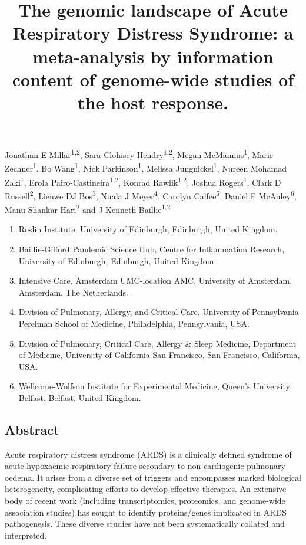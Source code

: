 \documentclass[
  11,
  a4paper,
]{article}
\title{The genomic landscape of Acute Respiratory Distress Syndrome: a
meta-analysis by information content of genome-wide studies of the host
response.}
\author{}
\date{}
\providecommand{\tightlist}{%
  \setlength{\itemsep}{0pt}\setlength{\parskip}{0pt}}\usepackage{longtable,booktabs,array}
\begin{document}
\maketitle

Jonathan E Millar\textsuperscript{1,2}, Sara
Clohisey-Hendry\textsuperscript{1,2}, Megan McMannus\textsuperscript{1},
Marie Zechner\textsuperscript{1}, Bo Wang\textsuperscript{1}, Nick
Parkinson\textsuperscript{1}, Melissa Jungnickel\textsuperscript{1},
Nureen Mohamad Zaki\textsuperscript{1}, Erola
Pairo-Castineira\textsuperscript{1,2}, Konrad
Rawlik\textsuperscript{1,2}, Joshua Rogers\textsuperscript{1}, Clark D
Russell\textsuperscript{2}, Lieuwe DJ Bos\textsuperscript{3}, Nuala J
Meyer\textsuperscript{4}, Carolyn Calfee\textsuperscript{5}, Daniel F
McAuley\textsuperscript{6}, Manu Shankar-Hari\textsuperscript{2} and J
Kenneth Baillie\textsuperscript{1,2}

\begin{enumerate}
\def\labelenumi{\arabic{enumi}.}
\tightlist
\item
  Roslin Institute, University of Edinburgh, Edinburgh, United Kingdom.
\item
  Baillie-Gifford Pandemic Science Hub, Centre for Inflammation
  Research, University of Edinburgh, Edinburgh, United Kingdom.
\item
  Intensive Care, Amsterdam UMC-location AMC, University of Amsterdam,
  Amsterdam, The Netherlands.
\item
  Division of Pulmonary, Allergy, and Critical Care, University of
  Pennsylvania Perelman School of Medicine, Philadelphia, Pennsylvania,
  USA.
\item
  Division of Pulmonary, Critical Care, Allergy \& Sleep Medicine,
  Department of Medicine, University of California San Francisco, San
  Francisco, California, USA.
\item
  Wellcome-Wolfson Institute for Experimental Medicine, Queen's
  University Belfast, Belfast, United Kingdom.
\end{enumerate}

\newpage

\subsection{Abstract}\label{abstract}

Acute respiratory distress syndrome (ARDS) is a clinically defined
syndrome of acute hypoxaemic respiratory failure secondary to
non-cardiogenic pulmonary oedema. It arises from a diverse set of
triggers and encompasses marked biological heterogeneity, complicating
efforts to develop effective therapies. An extensive body of recent work
(including transcriptomics, proteomics, and genome-wide association
studies) has sought to identify proteins/genes implicated in ARDS
pathogenesis. These diverse studies have not been systematically
collated and interpreted.
\end{document}
